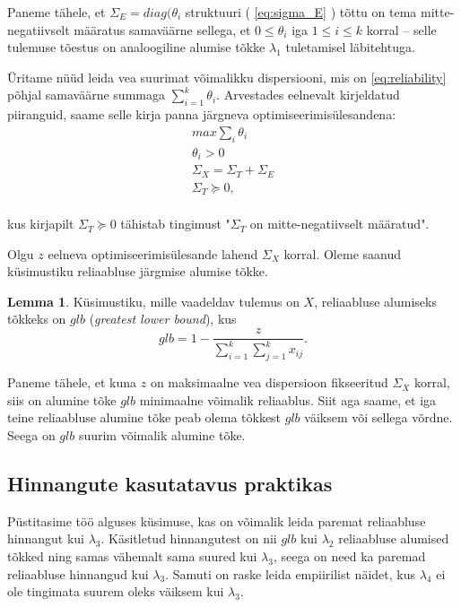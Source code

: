 \documentclass[a4paper,12pt,oneside]{article}
\newcounter{lemma}[section]
\numberwithin{equation}{section}
\theoremstyle{definition}
\newtheorem{glb}[lemma]{Lemma}
\begin{document}
Paneme tähele, et $\Sigma_E=diag(\theta_i$ struktuuri  ( \ref{eq:sigma_E} ) tõttu on tema mitte-negatiivselt määratus samaväärne sellega, et $0 \leq \theta_i$ iga $1 \leq i \leq k$ korral -- selle tulemuse tõestus on analoogiline alumise tõkke $\lambda_1$ tuletamisel läbitehtuga.

 
\"Uritame n\"u\"ud  leida vea suurimat võimalikku dispersiooni, mis on \eqref{eq:reliability} põhjal samaväärne summaga $\sum \limits_{i=1}^k \theta_i$. Arvestades eelnevalt kirjeldatud piiranguid, saame selle  kirja panna järgneva optimiseerimis\"ulesandena:
\begin{equation}
\begin{gathered}
max \sum_i \theta_i \\
\theta_i > 0 \\
\Sigma_X = \Sigma_T + \Sigma_E \\
\Sigma_T \succeq 0, \\
\end{gathered} 
\end{equation} 

kus kirjapilt $\Sigma_T \succeq 0$ tähistab tingimust "$\Sigma_T$ on mitte-negatiivselt määratud". 

Olgu $z$ eelneva optimiseerimis\"ulesande lahend $\Sigma_X$ korral. Oleme saanud küsimustiku reliaabluse järgmise alumise tõkke.
\vspace{10pt}
\begin{glb}
Küsimustiku, mille vaadeldav tulemus on $X$, reliaabluse alumiseks tõkkeks on $glb$ (\textit{greatest lower bound}), kus 
\begin{equation*}
glb = 1 - \frac{z}{\sum \limits_{i=1}^k \sum \limits_{j=1}^k x_{ij}} \text{.}
\end{equation*}  
\end{glb}

Paneme tähele, et kuna $z$ on maksimaalne vea dispersioon fikseeritud $\Sigma_X$ korral, siis on alumine tõke $glb$ minimaalne võimalik reliaablus. Siit aga saame, et iga teine reliaabluse alumine tõke peab olema tõkkest $glb$ väiksem või sellega võrdne. Seega on $glb$ suurim võimalik alumine tõke. 

\subsection{Hinnangute kasutatavus praktikas}

Püstitasime töö alguses küsimuse, kas on võimalik leida paremat reliaabluse hinnangut kui $\lambda_3$. Käsitletud hinnangutest on nii $glb$ kui $\lambda_2$ reliaabluse alumised tõkked ning samas vähemalt sama suured kui $\lambda_3$, seega on need ka paremad reliaabluse hinnangud kui $\lambda_3$. {\color{red}Samuti on raske leida empiirilist näidet, kus  $\lambda_4$ ei ole tingimata suurem oleks väiksem kui $\lambda_3$.}
\end{document}
